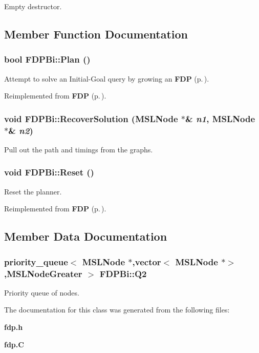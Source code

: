 Empty destructor.



\subsection{Member Function Documentation}
\subsubsection{\setlength{\rightskip}{0pt plus 5cm}bool FDPBi::Plan ()\hspace{0.3cm}{\tt  [virtual]}}\label{classFDPBi_a3}


Attempt to solve an Initial-Goal query by growing an {\bf FDP} {\rm (p.\,\pageref{classFDP})}.



Reimplemented from {\bf FDP} {\rm (p.\,\pageref{classFDP_a3})}.
\subsubsection{\setlength{\rightskip}{0pt plus 5cm}void FDPBi::Recover\-Solution ({\bf MSLNode} $\ast$\& {\em n1}, {\bf MSLNode} $\ast$\& {\em n2})\hspace{0.3cm}{\tt  [protected]}}\label{classFDPBi_b0}


Pull out the path and timings from the graphs.

\subsubsection{\setlength{\rightskip}{0pt plus 5cm}void FDPBi::Reset ()\hspace{0.3cm}{\tt  [virtual]}}\label{classFDPBi_a2}


Reset the planner.



Reimplemented from {\bf FDP} {\rm (p.\,\pageref{classFDP_a2})}.

\subsection{Member Data Documentation}
\subsubsection{\setlength{\rightskip}{0pt plus 5cm}priority\_\-queue$<$ {\bf MSLNode} $\ast$,vector$<$ {\bf MSLNode} $\ast$$>$,{\bf MSLNode\-Greater} $>$ FDPBi::Q2\hspace{0.3cm}{\tt  [protected]}}\label{classFDPBi_n0}


Priority queue of nodes.



The documentation for this class was generated from the following files:\begin{CompactItemize}
\item 
{\bf fdp.h}\item 
{\bf fdp.C}\end{CompactItemize}
